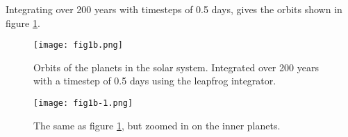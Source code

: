 Integrating over 200 years with timesteps of 0.5 days, gives the orbits shown in figure \ref{fig:orbits}.
\begin{figure}
    \centering
    \texttt{[image: fig1b.png]}
    \caption{Orbits of the planets in the solar system. Integrated over 200 years with a timestep of 0.5 days using the leapfrog integrator.}
    \label{fig:orbits}
\end{figure}
\begin{figure}
    \centering
    \texttt{[image: fig1b-1.png]}
    \caption{The same as figure \ref{fig:orbits}, but zoomed in on the inner planets.}
    \label{fig:orbits-zoom}
\end{figure}




